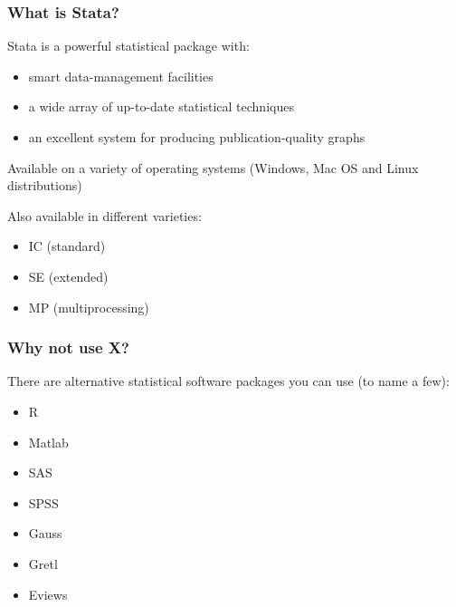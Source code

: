 \documentclass[10pt, compress]{beamer}
\begin{document}
\begin{frame}[fragile]
  \frametitle{What is Stata?}
  Stata is a powerful statistical package with:
  \begin{itemize}

   \item  smart data-management facilities
  
   \item  a wide array of up-to-date statistical techniques
  
   \item  an excellent system for producing publication-quality graphs
    
  \end{itemize}
  
  Available on a variety of operating systems (Windows, Mac OS and Linux distributions)
  
  Also available in different varieties:
  
    \begin{itemize}

   \item  IC (standard)
  
   \item SE (extended)
  
   \item  MP (multiprocessing)
    
  \end{itemize}
  
\end{frame}


\begin{frame}[fragile]
\frametitle{Why not use X?}
There are alternative statistical software packages you can use (to name a few):

\begin{itemize}
    \item R
    \item Matlab
    \item SAS
    \item SPSS
    \item Gauss
    \item Gretl
    \item Eviews
\end{itemize}

\end{frame}
\end{document}
